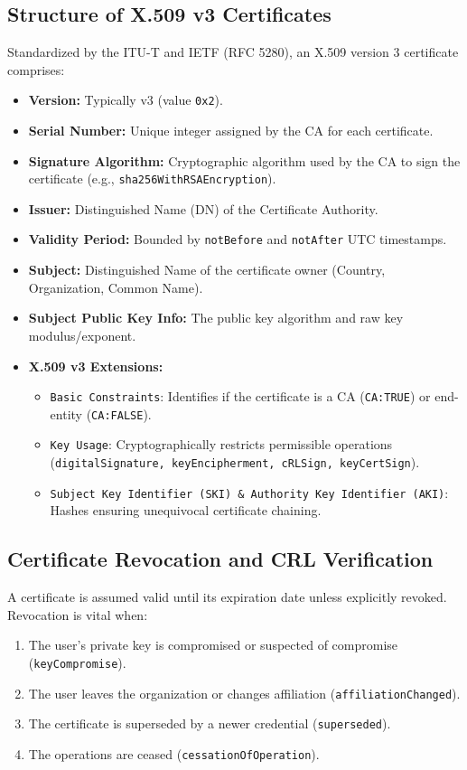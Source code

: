 \documentclass[12pt,a4paper]{article}
\begin{document}
\subsection{Structure of X.509 v3 Certificates}
Standardized by the ITU-T and IETF (RFC 5280), an X.509 version 3 certificate comprises:
\begin{itemize}
    \item \textbf{Version:} Typically v3 (value \texttt{0x2}).
    \item \textbf{Serial Number:} Unique integer assigned by the CA for each certificate.
    \item \textbf{Signature Algorithm:} Cryptographic algorithm used by the CA to sign the certificate (e.g., \texttt{sha256WithRSAEncryption}).
    \item \textbf{Issuer:} Distinguished Name (DN) of the Certificate Authority.
    \item \textbf{Validity Period:} Bounded by \texttt{notBefore} and \texttt{notAfter} UTC timestamps.
    \item \textbf{Subject:} Distinguished Name of the certificate owner (Country, Organization, Common Name).
    \item \textbf{Subject Public Key Info:} The public key algorithm and raw key modulus/exponent.
    \item \textbf{X.509 v3 Extensions:}
    \begin{itemize}
        \item \texttt{Basic Constraints}: Identifies if the certificate is a CA (\texttt{CA:TRUE}) or end-entity (\texttt{CA:FALSE}).
        \item \texttt{Key Usage}: Cryptographically restricts permissible operations (\texttt{digitalSignature, keyEncipherment, cRLSign, keyCertSign}).
        \item \texttt{Subject Key Identifier (SKI) \& Authority Key Identifier (AKI)}: Hashes ensuring unequivocal certificate chaining.
    \end{itemize}
\end{itemize}

\subsection{Certificate Revocation and CRL Verification}
A certificate is assumed valid until its expiration date unless explicitly revoked. Revocation is vital when:
\begin{enumerate}
    \item The user's private key is compromised or suspected of compromise (\texttt{keyCompromise}).
    \item The user leaves the organization or changes affiliation (\texttt{affiliationChanged}).
    \item The certificate is superseded by a newer credential (\texttt{superseded}).
    \item The operations are ceased (\texttt{cessationOfOperation}).
\end{enumerate}
\end{document}
